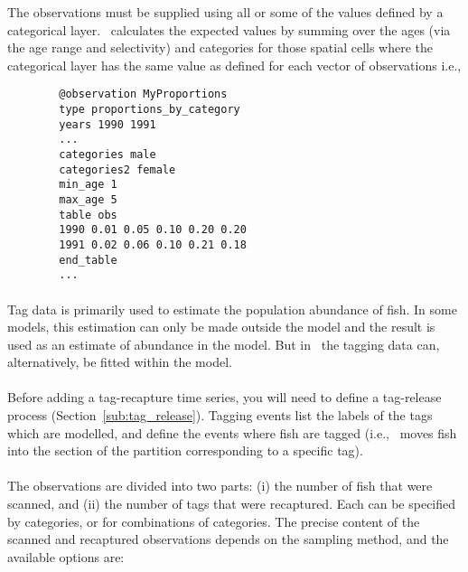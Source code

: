 The observations must be supplied using all or some of the values defined by a categorical layer. \CNAME\ calculates the expected values by summing over the ages (via the age range and selectivity) and categories for those spatial cells where the categorical layer has the same value as defined for each vector of observations i.e.,

{\small{\begin{verbatim}
		@observation MyProportions
		type proportions_by_category
		years 1990 1991
		...
		categories male
		categories2 female
		min_age 1
		max_age 5
		table obs
		1990 0.01 0.05 0.10 0.20 0.20
		1991 0.02 0.06 0.10 0.21 0.18
		end_table
		...
		\end{verbatim}}}

\paragraph*{\label{sec:tag-recapture-by-length}}

Tag data is primarily used to estimate the population abundance of fish. In some models, this estimation can only be made outside the model and the result is used as an estimate of abundance in the model. But in \CNAME\ the tagging data can, alternatively, be fitted within the model.
\\\\
Before adding a tag-recapture time series, you will need to define a tag-release process (Section~\ref{sub:tag_release}). Tagging events list the labels of the tags which are modelled, and define the events where fish are tagged (i.e., \CNAME\ moves fish into the section of the partition corresponding to a specific tag).
\\\\
The observations are divided into two parts: (i) the number of fish that were scanned, and (ii) the number of tags that were recaptured. Each can be specified by categories, or for combinations of categories. The precise content of the scanned and recaptured observations depends on the sampling method, and the available options are:

